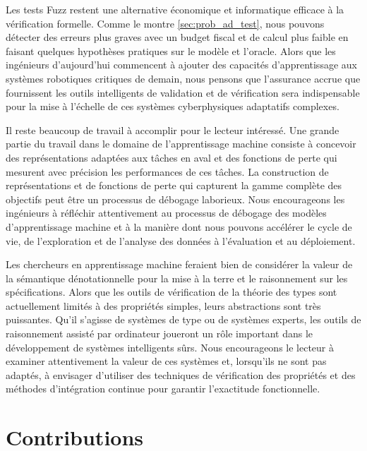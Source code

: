 Les tests Fuzz restent une alternative économique et informatique efficace à la vérification formelle. Comme le montre \autoref{sec:prob_ad_test}, nous pouvons détecter des erreurs plus graves avec un budget fiscal et de calcul plus faible en faisant quelques hypothèses pratiques sur le modèle et l'oracle. Alors que les ingénieurs d'aujourd'hui commencent à ajouter des capacités d'apprentissage aux systèmes robotiques critiques de demain, nous pensons que l'assurance accrue que fournissent les outils intelligents de validation et de vérification sera indispensable pour la mise à l'échelle de ces systèmes cyberphysiques adaptatifs complexes.

Il reste beaucoup de travail à accomplir pour le lecteur intéressé. Une grande partie du travail dans le domaine de l'apprentissage machine consiste à concevoir des représentations adaptées aux tâches en aval et des fonctions de perte qui mesurent avec précision les performances de ces tâches. La construction de représentations et de fonctions de perte qui capturent la gamme complète des objectifs peut être un processus de débogage laborieux. Nous encourageons les ingénieurs à réfléchir attentivement au processus de débogage des modèles d'apprentissage machine et à la manière dont nous pouvons accélérer le cycle de vie, de l'exploration et de l'analyse des données à l'évaluation et au déploiement.

Les chercheurs en apprentissage machine feraient bien de considérer la valeur de la sémantique dénotationnelle pour la mise à la terre et le raisonnement sur les spécifications. Alors que les outils de vérification de la théorie des types sont actuellement limités à des propriétés simples, leurs abstractions sont très puissantes. Qu'il s'agisse de systèmes de type ou de systèmes experts, les outils de raisonnement assisté par ordinateur joueront un rôle important dans le développement de systèmes intelligents sûrs. Nous encourageons le lecteur à examiner attentivement la valeur de ces systèmes et, lorsqu'ils ne sont pas adaptés, à envisager d'utiliser des techniques de vérification des propriétés et des méthodes d'intégration continue pour garantir l'exactitude fonctionnelle.

\section{Contributions}

